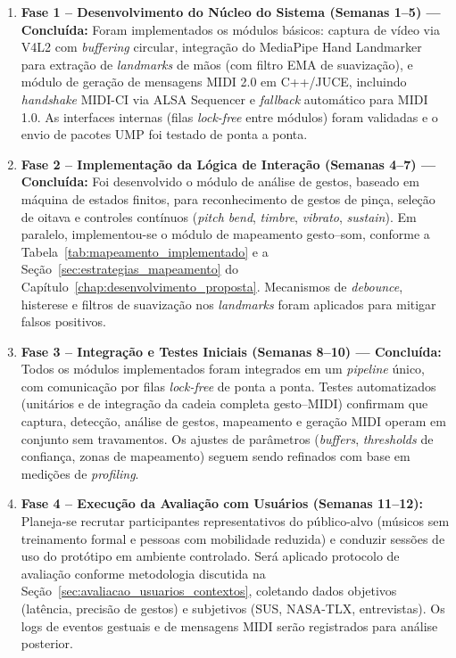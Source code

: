 \begin{enumerate}
    \item \textbf{Fase 1 – Desenvolvimento do Núcleo do Sistema (Semanas 1–5) — Concluída:}
    Foram implementados os módulos básicos: captura de vídeo via V4L2 com \textit{buffering} circular, integração do MediaPipe Hand Landmarker para extração de \textit{landmarks} de mãos (com filtro EMA de suavização), e módulo de geração de mensagens MIDI 2.0 em C++/JUCE, incluindo \textit{handshake} MIDI-CI via ALSA Sequencer e \textit{fallback} automático para MIDI 1.0. As interfaces internas (filas \textit{lock-free} entre módulos) foram validadas e o envio de pacotes UMP foi testado de ponta a ponta.
    \item \textbf{Fase 2 – Implementação da Lógica de Interação (Semanas 4–7) — Concluída:}
    Foi desenvolvido o módulo de análise de gestos, baseado em máquina de estados finitos, para reconhecimento de gestos de pinça, seleção de oitava e controles contínuos (\textit{pitch bend}, \textit{timbre}, \textit{vibrato}, \textit{sustain}). Em paralelo, implementou-se o módulo de mapeamento gesto–som, conforme a Tabela~\ref{tab:mapeamento_implementado} e a Seção~\ref{sec:estrategias_mapeamento} do Capítulo~\ref{chap:desenvolvimento_proposta}. Mecanismos de \textit{debounce}, histerese e filtros de suavização nos \textit{landmarks} foram aplicados para mitigar falsos positivos.
    \item \textbf{Fase 3 – Integração e Testes Iniciais (Semanas 8–10) — Concluída:}
    Todos os módulos implementados foram integrados em um \textit{pipeline} único, com comunicação por filas \textit{lock-free} de ponta a ponta. Testes automatizados (unitários e de integração da cadeia completa gesto–MIDI) confirmam que captura, detecção, análise de gestos, mapeamento e geração MIDI operam em conjunto sem travamentos. Os ajustes de parâmetros (\textit{buffers}, \textit{thresholds} de confiança, zonas de mapeamento) seguem sendo refinados com base em medições de \textit{profiling}.
    \item \textbf{Fase 4 – Execução da Avaliação com Usuários (Semanas 11–12):}
    Planeja-se recrutar participantes representativos do público-alvo (músicos sem treinamento formal e pessoas com mobilidade reduzida) e conduzir sessões de uso do protótipo em ambiente controlado. Será aplicado protocolo de avaliação conforme metodologia discutida na Seção~\ref{sec:avaliacao_usuarios_contextos}, coletando dados objetivos (latência, precisão de gestos) e subjetivos (SUS, NASA-TLX, entrevistas). Os logs de eventos gestuais e de mensagens MIDI serão registrados para análise posterior.

\end{enumerate}
